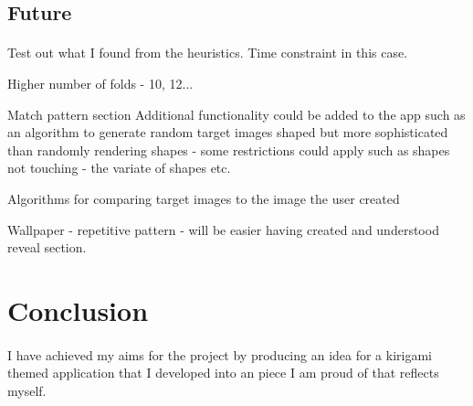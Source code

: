 \documentclass[11pt]{article}
\begin{document}
            
    \subsection{Future}
        
                \paragraph{}
                
                Test out what I found from the heuristics. Time constraint in this case. 
                
                Higher number of folds - 10, 12...
                
                Match pattern section
                Additional functionality could be added to the app such as an algorithm to generate random target images shaped but more sophisticated than randomly rendering shapes - some restrictions could apply such as shapes not touching - the variate of shapes etc.
                
                Algorithms for comparing target images to the image the user created 
                
                Wallpaper - repetitive pattern - will be easier having created and understood  reveal section. 
                
                
                






\newpage
\section{Conclusion}
        
            \paragraph{}
            I have achieved my aims for the project by producing an idea for a kirigami themed application that I developed into an piece I am proud of that reflects myself. 
            
\end{document}
